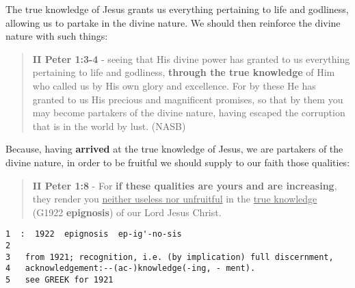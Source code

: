 \documentclass[11pt]{article}
\begin{document}
The true knowledge of Jesus grants us everything pertaining to life and godliness, allowing us to partake in the divine nature. We should then reinforce the divine nature with such things:

\begin{quote}
\textbf{II Peter 1:3-4} - seeing that His divine power has granted to us everything pertaining to life and godliness, \textbf{through the true knowledge} of Him who called us by His own glory and excellence. For by these He has granted to us His precious and magnificent promises, so that by them you may become partakers of the divine nature, having escaped the corruption that is in the world by lust. (NASB)
\end{quote}

Because, having \textbf{arrived} at the true knowledge of Jesus, we are partakers of the divine nature, in order to be fruitful we should supply to our faith those qualities:

\begin{quote}
\textbf{II Peter 1:8} - For \textbf{if these qualities are yours and are increasing}, they render you \uline{neither useless nor unfruitful} in the \uline{true knowledge} (G1922 \textbf{epignosis}) of our Lord Jesus Christ.
\end{quote}

\begin{verbatim}
1  :  1922  epignosis  ep-ig'-no-sis
2  
3   from 1921; recognition, i.e. (by implication) full discernment,
4   acknowledgement:--(ac-)knowledge(-ing, - ment).
5   see GREEK for 1921
\end{verbatim}
\end{document}
